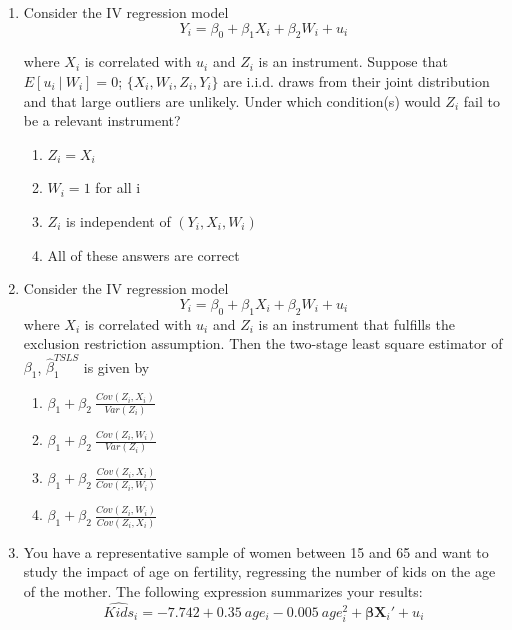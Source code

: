 \documentclass{article}
\begin{document}
\begin{enumerate}
\item Consider the IV regression model
\begin{equation*}
    Y_i = \beta_0 + \beta_1 X_i + \beta_2 W_i + u_i
\end{equation*}

where $X_i$ is correlated with $u_i$ and $Z_i$ is an instrument. Suppose that $E[u_i~\vert~ W_{i}] = 0$; $\{X_{i}, W_{i}, Z_{i}, Y_i\}$ are i.i.d. draws from their joint
distribution and that large outliers are unlikely. Under which condition(s) would $Z_i$ fail to be a relevant instrument?

\begin{enumerate}[label=\alph*)]
\item $Z_i = X_i$
\item $W_i = 1$ for all i
\item {\color{blue} $Z_i$ is independent of $(Y_i, X_i, W_i)$}
\item All of these answers are correct
\end{enumerate}\vspace{.25cm}



\item Consider the IV regression model
\begin{equation*}
    Y_i = \beta_0 + \beta_1 X_i + \beta_2 W_i + u_i
\end{equation*}
where $X_i$ is correlated with $u_i$ and $Z_i$ is an instrument that fulfills the exclusion restriction assumption. Then the two-stage least square estimator of $\beta_1$, $\hat{\beta}_1^{TSLS}$ is given by
\begin{enumerate}[label=\alph*)]
\item $\beta_1+\beta_2~\frac{Cov(Z_i, X_i)}{Var(Z_i)}$
\item $\beta_1+\beta_2~\frac{Cov(Z_i, W_i)}{Var(Z_i)}$ 
\item $\beta_1+\beta_2~\frac{Cov(Z_i, X_i)}{Cov(Z_i, W_i)}$
\item {\color{blue}$\beta_1+\beta_2~\frac{Cov(Z_i, W_i)}{Cov(Z_i, X_i)}$ }
\end{enumerate}\vspace{.25cm}


\item You have a representative sample of women between 15 and 65 and want to study the impact of age on fertility, regressing the number of kids on the age of the mother. The following expression summarizes your results:
\begin{equation*}
    \widehat{Kids}_i = -7.742 + 0.35~age_i - 0.005~age_i^2 + \mathbf{\beta}\textbf{X}_{i}' + u_i
\end{equation*}


\end{enumerate}
\end{document}
